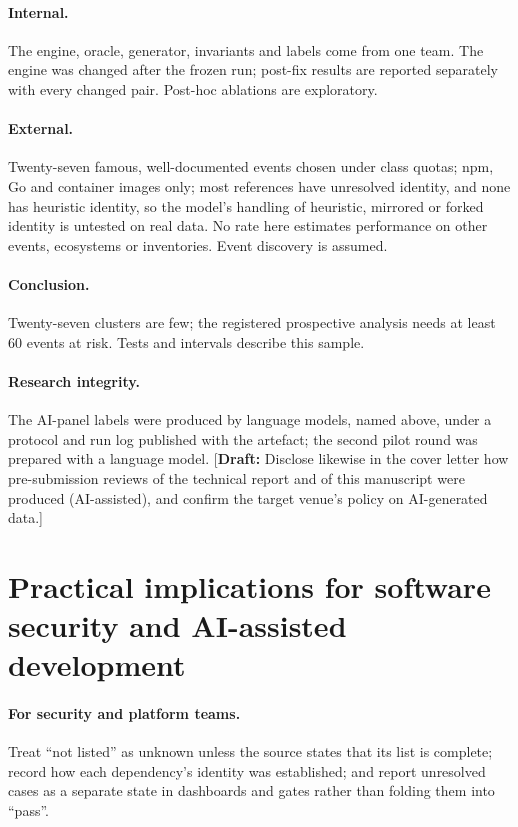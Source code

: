 \documentclass[11pt]{article}
\newcommand{\draftnote}[1]{\textcolor{red!70!black}{[\textbf{Draft:} #1]}}
\begin{document}
\paragraph{Internal.} The engine, oracle, generator, invariants and labels
come from one team. The engine was changed after the frozen run; post-fix
results are reported separately with every changed pair. Post-hoc ablations
are exploratory.

\paragraph{External.} Twenty-seven famous, well-documented events chosen
under class quotas; npm, Go and container images only; most references have
unresolved identity, and none has heuristic identity, so the model's handling
of heuristic, mirrored or forked identity is untested on real data. No rate here estimates performance on other events,
ecosystems or inventories. Event discovery is assumed.

\paragraph{Conclusion.} Twenty-seven clusters are few; the registered
prospective analysis needs at least 60 events at risk. Tests and intervals
describe this sample.

\paragraph{Research integrity.} The AI-panel labels were produced by
language models, named above, under a protocol and run log published with the
artefact; the second pilot round was prepared with a language model.
\draftnote{Disclose likewise in the cover letter how pre-submission reviews of
the technical report and of this manuscript were produced (AI-assisted), and
confirm the target venue's policy on AI-generated data.}

\section{Practical implications for software security and AI-assisted development}

\paragraph{For security and platform teams.} Treat ``not listed'' as unknown
unless the source states that its list is complete; record how each
dependency's identity was established; and report unresolved cases as a
separate state in dashboards and gates rather than folding them into ``pass''.
\end{document}
